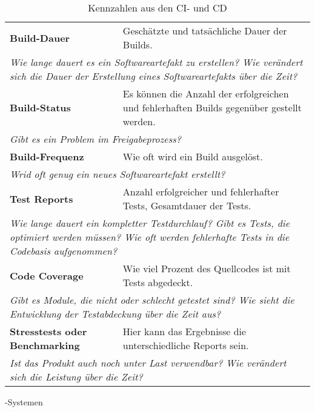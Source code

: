   \begin{table}[H]
    \centering
    \begin{tabular}{p{6.5cm}p{8cm}} \toprule
    \textbf{Build-Dauer} & Geschätzte und tatsächliche Dauer der Builds. \\
    \multicolumn{2}{p{14.5cm}}{\textit{Wie lange dauert es ein Softwareartefakt zu erstellen? \newline Wie verändert sich die Dauer der Erstellung eines Softwareartefakts über die Zeit?}} \\ \midrule
    \textbf{Build-Status} & Es können die Anzahl der erfolgreichen und fehlerhaften Builds gegenüber gestellt werden. \\
    \multicolumn{2}{p{14.5cm}}{\textit{Gibt es ein Problem im Freigabeprozess?}} \\ \midrule
    \textbf{Build-Frequenz} & Wie oft wird ein Build ausgelöst. \\
    \multicolumn{2}{p{14.5cm}}{\textit{Wrid oft genug ein neues Softwareartefakt erstellt?}} \\ \midrule
    \textbf{Test Reports} & Anzahl erfolgreicher und fehlerhafter Tests, Gesamtdauer der Tests. \\
    \multicolumn{2}{p{14.5cm}}{\textit{Wie lange dauert ein kompletter Testdurchlauf? \newline Gibt es Tests, die optimiert werden müssen? \newline Wie oft werden fehlerhafte Tests in die Codebasis aufgenommen?}} \\ \midrule
    \textbf{Code Coverage} & Wie viel Prozent des Quellcodes ist mit Tests abgedeckt. \\
    \multicolumn{2}{p{14.5cm}}{\textit{Gibt es Module, die nicht oder schlecht getestet sind? \newline Wie sieht die Entwicklung der Testabdeckung über die Zeit aus?}} \\ \midrule
    \textbf{Stresstests oder Benchmarking} & Hier kann das Ergebnisse die unterschiedliche Reports sein. \\
    \multicolumn{2}{p{14.5cm}}{\textit{Ist das Produkt auch noch unter Last verwendbar? \newline Wie verändert sich die Leistung über die Zeit?}} \\ \bottomrule
    \end{tabular}
    \caption{Kennzahlen aus den \ac{CI}- und \ac{CD}}-Systemen\label{metrics-table-cicd}
  \end{table}
  
